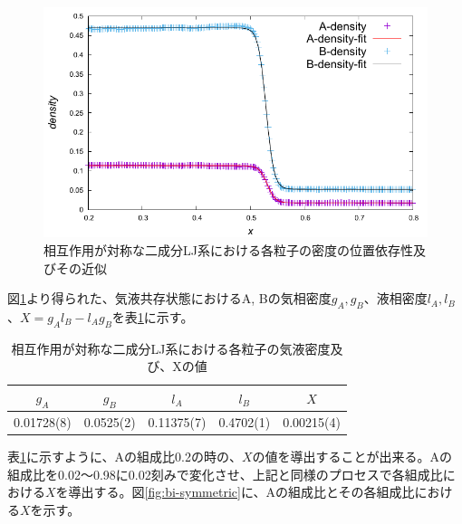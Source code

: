 \documentclass[titlepage]{jsreport}
\begin{document}
\begin{figure}[htbp]
    \begin{center}
        \includegraphics[width=14cm]{fig/lan140493-lbn561971-ran3930-rbn15722/lan140493-lbn561971-ran3930-rbn15722-fitting.pdf}
    \end{center}
    \caption{相互作用が対称な二成分LJ系における各粒子の密度の位置依存性及びその近似}
    \label{fig:lan140493-lbn561971-ran3930-rbn15722-fitting}
\end{figure}

\newpage

図\ref{fig:lan140493-lbn561971-ran3930-rbn15722-fitting}より得られた、気液共存状態におけるA, Bの気相密度$g_A, g_B$、液相密度$l_A, l_B$、$X=g_Al_B-l_Ag_B$を表\ref{table:lan140493-lbn561971-ran3930-rbn15722-fitting}に示す。

\begin{table}[htbp]
    \begin{center}
        \caption{相互作用が対称な二成分LJ系における各粒子の気液密度及び、Xの値}
        \label{table:lan140493-lbn561971-ran3930-rbn15722-fitting}
        \begin{tabular}{c c c c c}
            $g_A$ & $g_B$ & $l_A$ & $l_B$ & $X$ \\
            \hline
            0.01728(8)& 0.0525(2) & 0.11375(7) & 0.4702(1) & 0.00215(4) \\
        \end{tabular}
    \end{center}
\end{table}

表\ref{table:lan140493-lbn561971-ran3930-rbn15722-fitting}に示すように、Aの組成比0.2の時の、$X$の値を導出することが出来る。Aの組成比を0.02〜0.98に0.02刻みで変化させ、上記と同様のプロセスで各組成比における$X$を導出する。図\ref{fig:bi-symmetric}に、Aの組成比とその各組成比における$X$を示す。
\end{document}
